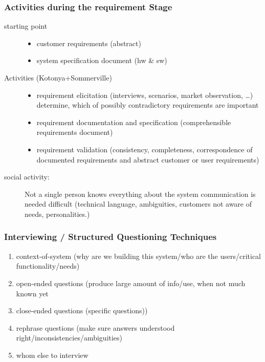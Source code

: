 \documentclass[a4paper, 10pt]{article}
\begin{document}
\subsubsection{Activities during the requirement Stage}
	\begin{description}
		\item[starting point] 
			\begin{itemize}
				\item customer requirements (abstract)
				\item system specification document (hw \& sw)
			\end{itemize}
		\item[Activities (Kotonya+Sommerville)]
			\begin{itemize}
				\item requirement elicitation (interviews, scenarios, market observation, \dots) \\
				determine, which of possibly contradictory requirements are important
				\item requirement documentation and specification (comprehensible requirements document)
				\item requirement validation (consistency, completeness, correspondence of documented requirements and abstract customer or user requirements)
			\end{itemize}
			
			\item[social activity:]
			Not a single person knows everything about the system \follows communication is needed \follows difficult (technical language, ambiguities, customers not aware of needs, personalities.)
	\end{description}

\subsubsection*{Interviewing / Structured Questioning Techniques}
\begin{enumerate}
	\item context-of-system (why are we building this system/who are the users/critical functionality/needs)
	\item open-ended questions (produce large amount of info/use, when not much known yet
	\item close-ended questions (specific questions))
	\item rephrase questions (make sure answers understood right/inconsistencies/ambiguities)
	\item whom else to interview
\end{enumerate}
\end{document}
